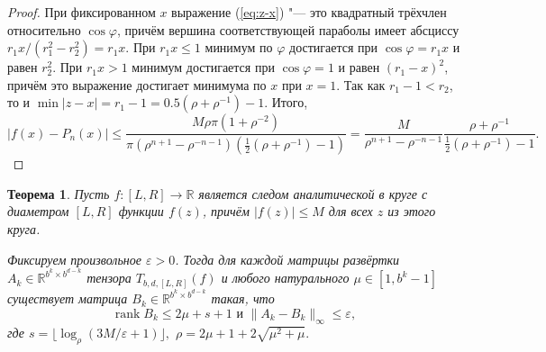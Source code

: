 \documentclass[3p]{cmmp}%
\DeclareMathOperator{\rank}{rank}
\newtheorem{theorem}{Теорема}
\numberwithin{equation}{section}
\begin{document}
\begin{proof}
	При фиксированном $x$ выражение (\ref{eq:z-x}) "--- это квадратный трёхчлен относительно $\cos \varphi$, причём вершина соответствующей параболы имеет абсциссу $r_1x/(r_1^2-r_2^2) = r_1x$.
	При $r_1x \le 1$ минимум по $\varphi$ достигается при $\cos \varphi = r_1x$ и равен $r_2^2$. 
	При $r_1x > 1$ минимум достигается при $\cos\varphi = 1$ и равен $(r_1-x)^2$, причём это выражение достигает минимума по $x$ при $x = 1$.
	Так как $r_1 - 1 < r_2$, то и $\min|z-x| = r_1 - 1 = 0.5(\rho + \rho^{-1})-1$.
	Итого, 
	\[
	|f(x)-P_n(x)| 
	\leq \frac{M \rho \pi (1+\rho^{-2})}{\pi (\rho^{n+1} - \rho^{-n-1})(\frac{1}{2}(\rho+\rho^{-1})-1)}
	= \frac{M}{\rho^{n+1} - \rho^{-n-1}} \frac{\rho+\rho^{-1}}{\frac{1}{2}(\rho+\rho^{-1})-1}.
	\]
\end{proof}

\begin{theorem}\label{thm:upper-1}
	Пусть $f: [L,R]\rightarrow \mathbb{R}$ является следом аналитической в круге с диаметром $[L,R]$ функции $f(z)$, причём $|f(z)| \leq M$ для всех $z$ из этого круга. 
	
	Фиксируем произвольное $\varepsilon > 0$. Тогда для каждой матрицы развёртки $A_k \in \mathbb{R}^{b^k \times b^{d-k}}$ тензора $T_{b,d,[L,R]}(f)$ и любого натурального $\mu \in [1, b^k - 1]$  существует матрица $B_k \in \mathbb{R}^{b^k \times b^{d-k}}$ такая, что
	\[
	\rank B_k \leq 2\mu + s + 1 \text{ и } \| A_k - B_k \|_{\infty} \leq \varepsilon,
	\]
	где $s = \lfloor \log_{\rho} (3M /\varepsilon +1)\rfloor, $ $\rho = 2\mu + 1+2 \sqrt{{\mu}^2+\mu}.$
\end{theorem}
\end{document}
